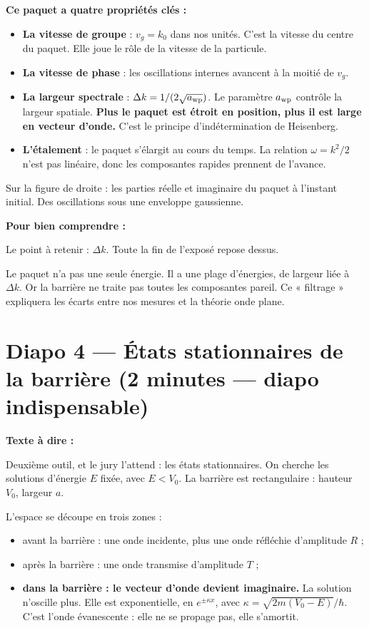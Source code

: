 \documentclass[12pt,a4paper]{article}
\newcommand{\diapo}[2]{\section*{Diapo #1 --- #2}}
\newenvironment{comprendre}%
  {\par\medskip\noindent\hrulefill\par\nopagebreak\textbf{Pour bien comprendre :}\par}%
  {\par\nopagebreak\noindent\hrulefill\par\medskip}
\begin{document}
\textbf{Ce paquet a quatre propriétés clés :}

\begin{itemize}
\item \textbf{La vitesse de groupe} : $v_g = k_0$ dans nos unités.
      C'est la vitesse du centre du paquet.
      Elle joue le rôle de la vitesse de la particule.
\item \textbf{La vitesse de phase} : les oscillations internes
      avancent à la moitié de $v_g$.
\item \textbf{La largeur spectrale} : $\Delta k = 1/(2\sqrt{a_{\rm wp}})$.
      Le paramètre $a_{\rm wp}$ contrôle la largeur spatiale.
      \textbf{Plus le paquet est étroit en position,
      plus il est large en vecteur d'onde.}
      C'est le principe d'indétermination de Heisenberg.
\item \textbf{L'étalement} : le paquet s'élargit au cours du temps.
      La relation $\omega = k^2/2$ n'est pas linéaire,
      donc les composantes rapides prennent de l'avance.
\end{itemize}

Sur la figure de droite : les parties réelle et imaginaire du paquet
à l'instant initial.
Des oscillations sous une enveloppe gaussienne.

\begin{comprendre}
Le point à retenir : $\Delta k$.
Toute la fin de l'exposé repose dessus.

Le paquet n'a pas une seule énergie.
Il a une plage d'énergies, de largeur liée à $\Delta k$.
Or la barrière ne traite pas toutes les composantes pareil.
Ce « filtrage » expliquera les écarts entre nos mesures
et la théorie onde plane.
\end{comprendre}

\clearpage
\diapo{4}{États stationnaires de la barrière (2 minutes --- diapo indispensable)}

\textbf{Texte à dire :}

Deuxième outil, et le jury l'attend : les états stationnaires.
On cherche les solutions d'énergie $E$ fixée, avec $E < V_0$.
La barrière est rectangulaire : hauteur $V_0$, largeur $a$.

L'espace se découpe en trois zones :

\begin{itemize}
\item avant la barrière : une onde incidente, plus une onde réfléchie
      d'amplitude $R$ ;
\item après la barrière : une onde transmise d'amplitude $T$ ;
\item \textbf{dans la barrière : le vecteur d'onde devient imaginaire.}
      La solution n'oscille plus.
      Elle est exponentielle, en $e^{\pm\kappa x}$,
      avec $\kappa = \sqrt{2m(V_0 - E)}/\hbar$.
      C'est l'onde évanescente : elle ne se propage pas, elle s'amortit.
\end{itemize}
\end{document}
